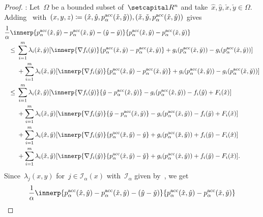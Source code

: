 \documentclass[../main]{subfiles}
\begin{document}
\begin{proof}
    :
    Let~$\Omega$ be a bounded subset of~$\setR^n$ and take~$\hat{x}, \hat{y}, \check{x}, \check{y} \in \Omega$.
    Adding~ with~$(x, y, z) \coloneqq (\hat{x}, \hat{y}, p^{\mathrm{acc}}_\alpha(\check{x}, \check{y})), (\check{x}, \check{y}, p^{\mathrm{acc}}_\alpha(\hat{x}, \hat{y}))$ gives
    \begin{align}
        \MoveEqLeft \frac{1}{\alpha} \innerp{p^\acc_\alpha(\hat{x}, \hat{y}) - p^\acc_\alpha(\check{x}, \check{y}) - (\hat{y} - \check{y})}{p^\acc_\alpha(\hat{x}, \hat{y}) - p^\acc_\alpha(\check{x}, \check{y})} \\
        \le{}& \sum_{i = 1}^{m} \lambda_i(\hat{x}, \hat{y}) [\innerp{\nabla f_i(\hat{y})}{p^\acc_\alpha(\check{x}, \check{y}) - p^\acc_\alpha(\hat{x}, \hat{y})} + g_i(p^\acc_\alpha(\check{x}, \check{y})) - g_i(p^\acc_\alpha(\hat{x}, \hat{y}))] \\
             &+ \sum_{i = 1}^{m} \lambda_i(\check{x}, \check{y}) [\innerp{\nabla f_i(\check{y})}{p^\acc_\alpha(\hat{x}, \hat{y}) - p^\acc_\alpha(\check{x}, \check{y})} + g_i(p^\acc_\alpha(\hat{x}, \hat{y})) - g_i(p^\acc_\alpha(\check{x}, \check{y}))] \\
        \le{}& \sum_{i = 1}^{m} \lambda_i(\hat{x}, \hat{y}) [\innerp{\nabla f_i(\hat{y})}{\hat{y} - p^\acc_\alpha(\hat{x}, \hat{y})} - g_i(p^\acc_\alpha(\hat{x}, \hat{y})) - f_i(\hat{y}) + F_i(\hat{x})] \\ 
                &+ \sum_{i = 1}^{m} \lambda_i(\check{x}, \check{y}) [\innerp{\nabla f_i(\check{y})}{\check{y} - p^\acc_\alpha(\check{x}, \check{y})} - g_i(p^\acc_\alpha(\check{x}, \check{y})) - f_i(\check{y}) + F_i(\check{x})] \\
                &+ \sum_{i = 1}^{m} \lambda_i(\hat{x}, \hat{y}) [\innerp{\nabla f_i(\hat{y})}{p^\acc_\alpha(\check{x}, \check{y}) - \hat{y}} + g_i(p^\acc_\alpha(\check{x}, \check{y})) + f_i(\hat{y}) - F_i(\hat{x})] \\
                &+ \sum_{i = 1}^{m} \lambda_i(\check{x}, \check{y}) [\innerp{\nabla f_i(\check{y})}{p^\acc_\alpha(\hat{x}, \hat{y}) - \check{y}} + g_i(p^\acc_\alpha(\hat{x}, \hat{y})) + f_i(\check{y}) - F_i(\check{x})]
    .\end{align}
    Since~$\lambda_j(x, y)$ for~$j \in \mathcal{I}_\alpha(x)$ with~$\mathcal{I}_\alpha$ given by~, we get
    \begin{align}
        \MoveEqLeft \frac{1}{\alpha} \innerp{p^\acc_\alpha(\hat{x}, \hat{y}) - p^\acc_\alpha(\check{x}, \check{y}) - (\hat{y} - \check{y})}{p^\acc_\alpha(\hat{x}, \hat{y}) - p^\acc_\alpha(\check{x}, \check{y})} \\

\end{align}
\end{proof}
\end{document}
